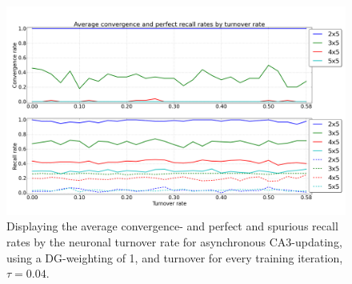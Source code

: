 \begin{figure}
    \centering
    \includegraphics[width=13cm]{fig/turnover_rates/async_tm1_dgw1}
    \caption{Displaying the average convergence- and perfect and spurious recall rates by the neuronal turnover rate for asynchronous CA3-updating, using a DG-weighting of 1, and turnover for every training iteration, $\tau=0.04$.}
    \label{fig:async_tm1_dgw1}
\end{figure}

\cleardoublepage